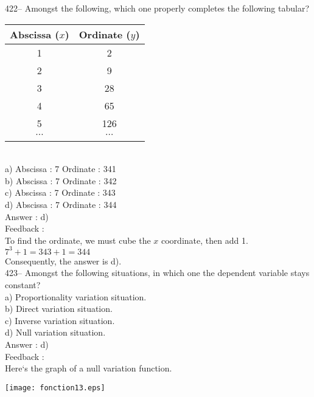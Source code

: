 ﻿\documentclass[letterpaper, 12pt]{article}
\begin{document}
422-- Amongst the following, which one properly completes the following tabular?\\
\begin{tabular}{|c|c|} \hline

{\bf Abscissa ($x$)} & {\bf Ordinate ($y$)}  \\ \hline \hline
1 & 2 \\ \hline
2 & 9 \\ \hline
3 & 28 \\ \hline
4 & 65 \\ \hline
5 & 126 \\ \hline
$\ldots$ & $\ldots$ \\ \hline
\multicolumn{2}{c}{}\\
\end{tabular}\\
a) Abscissa : 7 \qquad Ordinate : 341\\
b) Abscissa : 7 \qquad Ordinate : 342\\
c) Abscissa : 7 \qquad Ordinate : 343\\
d) Abscissa : 7 \qquad Ordinate : 344\\

Answer :  d)\\

Feedback : \\
To find the ordinate, we must cube the $x$ coordinate,
then add 1.\\
$7^{3}+1=343+1=344$\\
Consequently, the answer is d).\\

423-- Amongst the following situations, in which one the dependent variable stays constant?\\
a) Proportionality variation situation.\\
b) Direct variation situation.\\
c) Inverse variation situation.\\
d) Null variation situation.\\

Answer :  d)\\

Feedback : \\
Here`s the graph of a null variation function.\\
    \begin{center}
    \texttt{[image: fonction13.eps]}
    \end{center}
\end{document}
